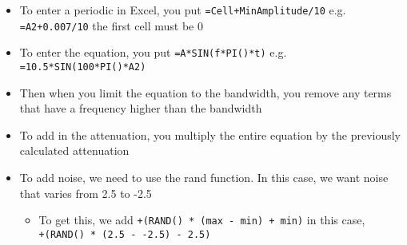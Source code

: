 
\begin{itemize}
  \item To enter a periodic in Excel, you put \verb|=Cell+MinAmplitude/10| e.g. \verb|=A2+0.007/10| the first cell must be 0
  \item To enter the equation, you put \verb|=A*SIN(f*PI()*t)| e.g. \verb|=10.5*SIN(100*PI()*A2)|
  \item Then when you limit the equation to the bandwidth, you remove any terms that have a frequency higher than the bandwidth
  \item To add in the attenuation, you multiply the entire equation by the previously calculated attenuation
  \item To add noise, we need to use the rand function. In this case, we want noise that varies from 2.5 to -2.5
  \begin{itemize}
    \item To get this, we add \verb|+(RAND() * (max - min) + min)| in this case, \\
    \verb|+(RAND() * (2.5 - -2.5) - 2.5)|
  \end{itemize}
\end{itemize}